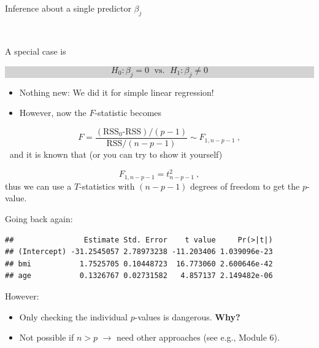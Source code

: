\documentclass[10pt,ignorenonframetext,]{beamer}
\newenvironment{Shaded}{\begin{snugshade}}{\end{snugshade}}
\newcommand{\KeywordTok}[1]{\textcolor[rgb]{0.13,0.29,0.53}{\textbf{#1}}}
\newcommand{\OperatorTok}[1]{\textcolor[rgb]{0.81,0.36,0.00}{\textbf{#1}}}
\newcommand{\NormalTok}[1]{#1}
\begin{document}
\begin{frame}

\begin{block}{Inference about a single predictor \(\beta_j\)}

\(~\)

A special case is

\begin{center}
\colorbox{lightgray}{\begin{minipage}{7cm}

$$H_0: \beta_j=0 \; \text{ vs. } \; H_1: \beta_j\neq 0$$
\end{minipage}}
\end{center}

\begin{itemize}
\item
  Nothing new: We did it for simple linear regression!
\item
  However, now the \(F\)-statistic becomes
\end{itemize}

\[F=\frac{(\text{RSS$_0$-RSS})/(p-1)}{\text{RSS}/(n-p-1)} \sim F_{1,n-p-1} \ ,\]
\(~\) and it is known that (or you can try to show it yourself)

\[F_{1,n-p-1} = t^2_{n-p-1} \ ,\] thus we can use a \(T\)-statistics
with \((n-p-1)\) degrees of freedom to get the \(p\)-value.

\end{block}

\end{frame}

\begin{frame}[fragile]

Going back again:

\footnotesize

\begin{Shaded}
\end{Shaded}

\begin{verbatim}
##                Estimate Std. Error    t value     Pr(>|t|)
## (Intercept) -31.2545057 2.78973238 -11.203406 1.039096e-23
## bmi           1.7525705 0.10448723  16.773060 2.600646e-42
## age           0.1326767 0.02731582   4.857137 2.149482e-06
\end{verbatim}

\normalsize

However:

\begin{itemize}
\item
  Only checking the individual \(p\)-values is dangerous.
  \textbf{Why?}\\
\item
  Not possible if \(n>p\) \(\rightarrow\) need other approaches (see
  e.g., Module 6).
\end{itemize}

\end{frame}
\end{document}
